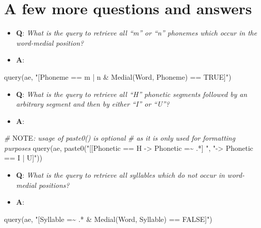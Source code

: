 \documentclass[
]{book}
\newenvironment{Shaded}{\begin{snugshade}}{\end{snugshade}}
\newcommand{\AlertTok}[1]{\textcolor[rgb]{0.94,0.16,0.16}{#1}}
\newcommand{\CommentTok}[1]{\textcolor[rgb]{0.56,0.35,0.01}{\textit{#1}}}
\newcommand{\FunctionTok}[1]{\textcolor[rgb]{0.00,0.00,0.00}{#1}}
\newcommand{\NormalTok}[1]{#1}
\newcommand{\StringTok}[1]{\textcolor[rgb]{0.31,0.60,0.02}{#1}}
\providecommand{\tightlist}{%
  \setlength{\itemsep}{0pt}\setlength{\parskip}{0pt}}
\begin{document}
\hypertarget{a-few-more-questions-and-answers}{%
\section{A few more questions and answers}\label{a-few-more-questions-and-answers}}

\begin{itemize}
\tightlist
\item
  \textbf{Q}: \emph{What is the query to retrieve all ``m'' or ``n'' phonemes which occur in the word-medial position?}
\item
  \textbf{A}:
\end{itemize}

\begin{Shaded}
\begin{Highlighting}[]
\FunctionTok{query}\NormalTok{(ae, }\StringTok{"[Phoneme == m | n \& Medial(Word, Phoneme) == TRUE]"}\NormalTok{)}
\end{Highlighting}
\end{Shaded}

\begin{itemize}
\tightlist
\item
  \textbf{Q}: \emph{What is the query to retrieve all ``H'' phonetic segments followed by an arbitrary segment and then by either ``I'' or ``U''?}
\item
  \textbf{A}:
\end{itemize}

\begin{Shaded}
\begin{Highlighting}[]
\CommentTok{\# }\AlertTok{NOTE}\CommentTok{: usage of paste0() is optional}
\CommentTok{\# as it is only used for formatting purposes}
\FunctionTok{query}\NormalTok{(ae, }\FunctionTok{paste0}\NormalTok{(}\StringTok{"[[Phonetic == H {-}\textgreater{} Phonetic =\textasciitilde{} .*] "}\NormalTok{,}
                 \StringTok{"{-}\textgreater{} Phonetic == I | U]"}\NormalTok{))}
\end{Highlighting}
\end{Shaded}

\begin{itemize}
\tightlist
\item
  \textbf{Q}: \emph{What is the query to retrieve all syllables which do not occur in word-medial positions?}
\item
  \textbf{A}:
\end{itemize}

\begin{Shaded}
\begin{Highlighting}[]
\FunctionTok{query}\NormalTok{(ae, }\StringTok{"[Syllable =\textasciitilde{} .* \& Medial(Word, Syllable) == FALSE]"}\NormalTok{)}
\end{Highlighting}
\end{Shaded}
\end{document}
